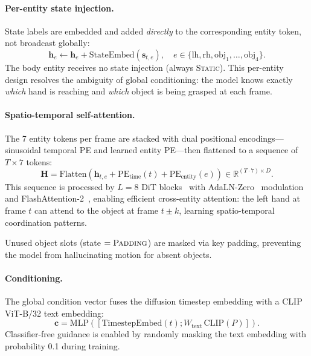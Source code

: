\paragraph{Per-entity state injection.}
State labels are embedded and added \emph{directly} to the corresponding entity token, not broadcast globally:
\begin{equation}
    \mathbf{h}_e \leftarrow \mathbf{h}_e + \text{StateEmbed}(\mathbf{s}_{t,e}), \quad e \in \{\text{lh}, \text{rh}, \text{obj}_1, \ldots, \text{obj}_4\}.
    \label{eq:state_inject}
\end{equation}
The body entity receives no state injection (always \textsc{Static}). This per-entity design resolves the ambiguity of global conditioning: the model knows exactly \emph{which} hand is reaching and \emph{which} object is being grasped at each frame.

\paragraph{Spatio-temporal self-attention.}
The 7 entity tokens per frame are stacked with dual positional encodings---sinusoidal temporal PE and learned entity PE---then flattened to a sequence of $T \times 7$ tokens:
\begin{equation}
    \mathbf{H} = \text{Flatten}\left(\mathbf{h}_{t,e} + \text{PE}_{\text{time}}(t) + \text{PE}_{\text{entity}}(e)\right) \in \mathbb{R}^{(T \cdot 7) \times D}.
    \label{eq:flatten}
\end{equation}
This sequence is processed by $L{=}8$ DiT blocks~\cite{peebles2023scalable} with AdaLN-Zero~\cite{peebles2023scalable} modulation and FlashAttention-2~\cite{dao2023flashattention2}, enabling efficient cross-entity attention: the left hand at frame $t$ can attend to the object at frame $t{\pm}k$, learning spatio-temporal coordination patterns.

Unused object slots (state $= \textsc{Padding}$) are masked via key padding, preventing the model from hallucinating motion for absent objects.

\paragraph{Conditioning.}
The global condition vector fuses the diffusion timestep embedding with a CLIP~\cite{radford2021learning} ViT-B/32 text embedding:
\begin{equation}
    \mathbf{c} = \text{MLP}([\text{TimestepEmbed}(t); W_{\text{text}}\,\text{CLIP}(P)]).
    \label{eq:condition}
\end{equation}
Classifier-free guidance is enabled by randomly masking the text embedding with probability 0.1 during training.


